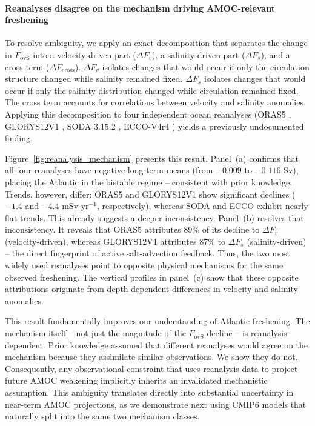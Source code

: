 \documentclass[11pt,a4paper]{article}
\begin{document}
\paragraph*{Reanalyses disagree on the mechanism driving AMOC-relevant freshening}

To resolve ambiguity, we apply an exact decomposition that separates the change in \(F_{\mathrm{ovS}}\) into a velocity-driven part (\(\Delta F_v\)), a salinity-driven part (\(\Delta F_s\)), and a cross term (\(\Delta F_{\mathrm{cross}}\)). \(\Delta F_v\) isolates changes that would occur if only the circulation structure changed while salinity remained fixed. \(\Delta F_s\) isolates changes that would occur if only the salinity distribution changed while circulation remained fixed. The cross term accounts for correlations between velocity and salinity anomalies. Applying this decomposition to four independent ocean reanalyses (ORAS5 \citep{Zuo2019}, GLORYS12V1 \citep{Lellouche2021}, SODA 3.15.2 \citep{Carton2018}, ECCO-V4r4 \citep{Forget2015}) yields a previously undocumented finding.

Figure~\ref{fig:reanalysis_mechanism} presents this result. Panel~(a) confirms that all four reanalyses have negative long-term means (from \(-0.009\) to \(-0.116\) Sv), placing the Atlantic in the bistable regime -- consistent with prior knowledge. Trends, however, differ: ORAS5 and GLORYS12V1 show significant declines (\(-1.4\) and \(-4.4\) mSv yr\(^{-1}\), respectively), whereas SODA and ECCO exhibit nearly flat trends. This already suggests a deeper inconsistency.
Panel~(b) resolves that inconsistency. It reveals that ORAS5 attributes 89\% of its decline to \(\Delta F_v\) (velocity-driven), whereas GLORYS12V1 attributes 87\% to \(\Delta F_s\) (salinity-driven) -- the direct fingerprint of active salt-advection feedback. Thus, the two most widely used reanalyses point to opposite physical mechanisms for the same observed freshening. The vertical profiles in panel~(c) show that these opposite attributions originate from depth-dependent differences in velocity and salinity anomalies.

This result fundamentally improves our understanding of Atlantic freshening. The mechanism itself -- not just the magnitude of the \(F_{\mathrm{ovS}}\) decline -- is reanalysis-dependent. Prior knowledge assumed that different reanalyses would agree on the mechanism because they assimilate similar observations. We show they do not. Consequently, any observational constraint that uses reanalysis data to project future AMOC weakening implicitly inherits an invalidated mechanistic assumption. This ambiguity translates directly into substantial uncertainty in near-term AMOC projections, as we demonstrate next using CMIP6 models that naturally split into the same two mechanism classes.
\end{document}
